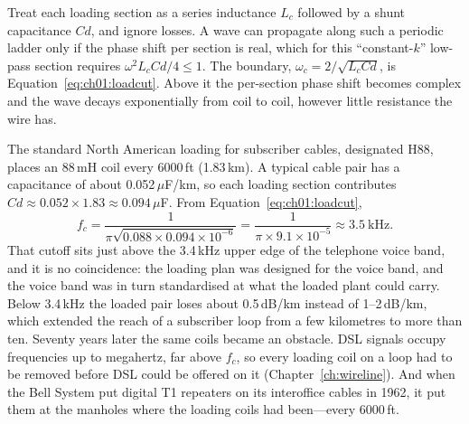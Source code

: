 \begin{deeper}
Treat each loading section as a series inductance $L_c$ followed by a shunt capacitance $Cd$, and
ignore losses. A wave can propagate along such a periodic ladder only if the phase shift per section
is real, which for this ``constant-$k$'' low-pass section requires
$\omega^2 L_c C d/4 \le 1$. The boundary, $\omega_c = 2/\sqrt{L_c C d}$, is
Equation~\eqref{eq:ch01:loadcut}. Above it the per-section phase shift becomes complex and the wave
decays exponentially from coil to coil, however little resistance the wire has.
\end{deeper}


\begin{worked}
The standard North American loading for subscriber cables, designated H88, places an 88\,mH coil
every 6000\,ft (1.83\,km). A typical cable pair has a capacitance of about 0.052\,$\mu$F/km, so
each loading section contributes $Cd\approx0.052\times1.83\approx0.094\,\mu$F. From
Equation~\eqref{eq:ch01:loadcut},
\[
f_c = \frac{1}{\pi\sqrt{0.088\times0.094\times10^{-6}}} = \frac{1}{\pi\times9.1\times10^{-5}}
\approx 3.5\ \mathrm{kHz}.
\]
That cutoff sits just above the 3.4\,kHz upper edge of the telephone voice band, and it is no
coincidence: the loading plan was designed for the voice band, and the voice band was in turn
standardised at what the loaded plant could carry. Below 3.4\,kHz the loaded pair loses about
0.5\,dB/km instead of 1--2\,dB/km, which extended the reach of a subscriber loop from a few
kilometres to more than ten. Seventy years later the same coils became an obstacle. DSL signals
occupy frequencies up to megahertz, far above $f_c$, so every loading coil on a loop had to be
removed before DSL could be offered on it (Chapter~\ref{ch:wireline}). And when the Bell System
put digital T1 repeaters on its interoffice cables in 1962, it put them at the manholes where the
loading coils had been---every 6000\,ft.
\end{worked}

